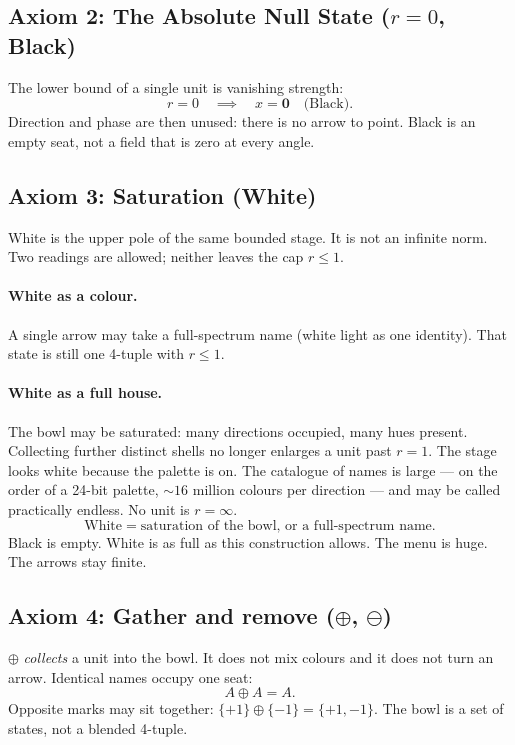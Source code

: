 \documentclass[12pt, a4paper]{article}
\begin{document}
\subsection{Axiom 2: The Absolute Null State ($r = 0$, Black)}
\label{subsec:axiom_null}
The lower bound of a single unit is vanishing strength:
\begin{equation}
    r = 0 \quad \implies \quad x = \mathbf{0}
    \quad \text{(Black)}.
    \label{eq:null_state}
\end{equation}
Direction and phase are then unused: there is no arrow to point.
Black is an empty seat, not a field that is zero at every angle.

\subsection{Axiom 3: Saturation (White)}
\label{subsec:axiom_white}
White is the upper pole of the same bounded stage. It is not an infinite
norm. Two readings are allowed; neither leaves the cap $r\le 1$.

\paragraph{White as a colour.}
A single arrow may take a full-spectrum name (white light as one
identity). That state is still one 4-tuple with $r\le 1$.

\paragraph{White as a full house.}
The bowl may be saturated: many directions occupied, many hues present.
Collecting further distinct shells no longer enlarges a unit past
$r=1$. The stage looks white because the palette is on. The catalogue
of names is large --- on the order of a 24-bit palette,
$\sim 16$ million colours per direction --- and may be called
practically endless. No unit is $r=\infty$.
\begin{equation}
    \text{White} \;=\; \text{saturation of the bowl, or a full-spectrum name.}
    \label{eq:white_state}
\end{equation}
Black is empty. White is as full as this construction allows. The
menu is huge. The arrows stay finite.

\subsection{Axiom 4: Gather and remove ($\oplus$, $\ominus$)}
\label{subsec:axiom_idempotence}
$\oplus$ \emph{collects} a unit into the bowl. It does not mix colours
and it does not turn an arrow. Identical names occupy one seat:
\begin{equation}
    A \oplus A = A.
    \label{eq:idempotence_formal}
\end{equation}
Opposite marks may sit together: $\{+1\}\oplus\{-1\}=\{+1,-1\}$.
The bowl is a set of states, not a blended 4-tuple.
\end{document}
